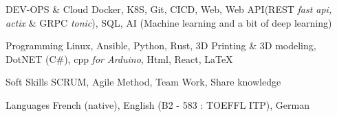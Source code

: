 

\begin{cvskills}

	\cvskill
	{DEV-OPS \& Cloud} %
	{Docker, K8S, Git, CICD, Web, Web API(REST \textit{fast api, actix} \& GRPC \textit{tonic}), SQL, AI (Machine learning and a bit of deep learning)} %

	\cvskill
	{Programming} %
    {Linux, Ansible, Python, Rust, 3D Printing \& 3D modeling, DotNET (C\#), cpp \textit{for Arduino}, Html, React, LaTeX} %

	\cvskill
	{Soft Skills} %
	{SCRUM, Agile Method, Team Work, Share knowledge} %

	\cvskill
	{Languages} %
	{French (native), English (B2 - 583  : TOEFFL ITP), German} %

\end{cvskills}

